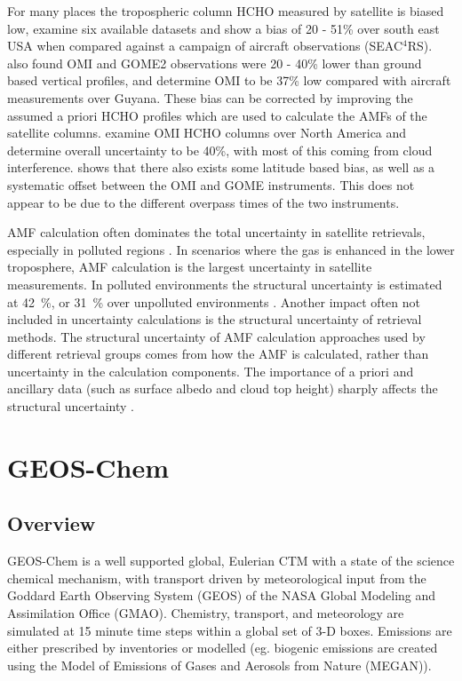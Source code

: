     For many places the tropospheric column HCHO measured by satellite is biased low, \textcite{Zhu2016} examine six available datasets and show a bias of 20 - 51\% over south east USA when compared against a campaign of aircraft observations (SEAC$^4$RS).
    \textcite{DeSmedt2015} also found OMI and GOME2 observations were 20 - 40\% lower than ground based vertical profiles, and \textcite{Barkley2013} determine OMI to be 37\% low compared with aircraft measurements over Guyana.
    These bias can be corrected by improving the assumed a priori HCHO profiles which are used to calculate the AMFs of the satellite columns.
    \textcite{Millet2006} examine OMI HCHO columns over North America and determine overall uncertainty to be 40\%, with most of this coming from cloud interference.
    \textcite{Millet2008} shows that there also exists some latitude based bias, as well as a systematic offset between the OMI and GOME instruments.
    This does not appear to be due to the different overpass times of the two instruments.
    
    AMF calculation often dominates the total uncertainty in satellite retrievals, especially in polluted regions \parencite{Lorente2017}.
    In scenarios where the gas is enhanced in the lower troposphere, AMF calculation is the largest uncertainty in satellite measurements.
    In polluted environments the structural uncertainty is estimated at 42~\%, or 31~\% over unpolluted environments \parencite{Lorente2017}.
    Another impact often not included in uncertainty calculations is the structural uncertainty of retrieval methods.
    The structural uncertainty of AMF calculation approaches used by different retrieval groups comes from how the AMF is calculated, rather than uncertainty in the calculation components.
    The importance of a priori and ancillary data (such as surface albedo and cloud top height) sharply affects the structural uncertainty \parencite{Lorente2017}.
    
\section{GEOS-Chem}
  \label{Model:GC}

  \subsection{Overview}
    GEOS-Chem is a well supported global, Eulerian CTM with a state of the science chemical mechanism, with transport driven by meteorological input from the Goddard Earth Observing System (GEOS) of the NASA Global Modeling and Assimilation Office (GMAO).
    Chemistry, transport, and meteorology are simulated at 15 minute time steps within a global set of 3-D boxes.
    Emissions are either prescribed by inventories or modelled (eg. biogenic emissions are created using the Model of Emissions of Gases and Aerosols from Nature (MEGAN)).
    
